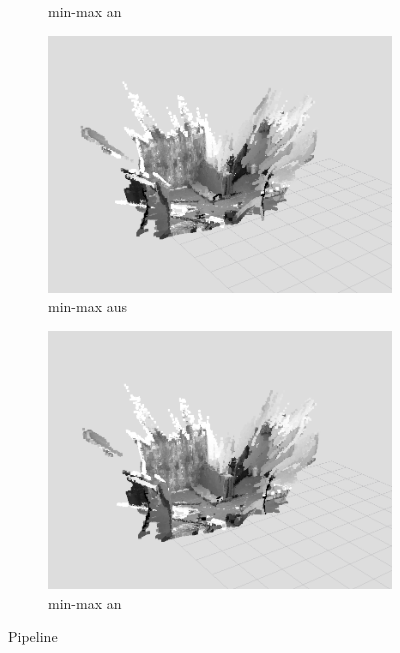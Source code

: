\documentclass[12pt,titlepage, a4paper]{article}
\begin{document}
\begin{figure}[h!]
\begin{subfigure}[h]{0.45\textwidth}
		\caption{min-max an}
	\end{subfigure}
	\begin{subfigure}[h]{0.45\textwidth}
		\includegraphics[width=\textwidth]{./jumpEdge/je_off_pointcloud.png}
		\caption{min-max aus}
	\end{subfigure}
	\begin{subfigure}[h]{0.45\textwidth}
		\includegraphics[width=\textwidth]{./jumpEdge/je_on_pointcloud.png}
		\caption{min-max an}
	\end{subfigure}	
 \caption{Pipeline}
\end{figure}
\end{document}
